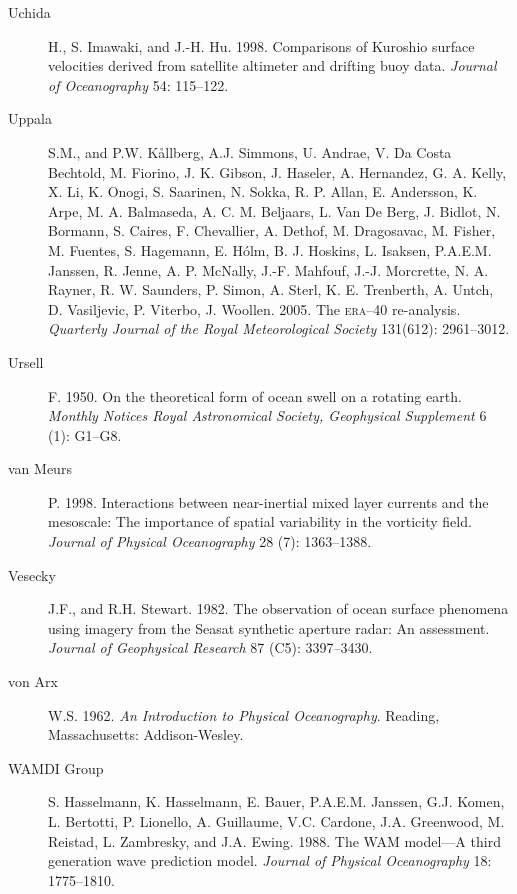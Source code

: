 \begin{description}
\item [Uchida]H., S. Imawaki, and J.-H. Hu. 1998. Comparisons of
  Kuroshio surface velocities derived from satellite altimeter and
  drifting buoy data. \textit{Journal of Oceanography} 54: 115--122.

\item [Uppala]S.M., and P.W. K\r{a}llberg, A.J. Simmons, U. Andrae,
  V. Da Costa Bechtold, M. Fiorino, J. K. Gibson, J. Haseler,
  A. Hernandez, G. A. Kelly, X. Li, K. Onogi, S. Saarinen, N. Sokka,
  R. P. Allan, E. Andersson, K. Arpe, M. A. Balmaseda,
  A. C. M. Beljaars, L. Van De Berg, J. Bidlot, N. Bormann, S. Caires,
  F. Chevallier, A. Dethof, M. Dragosavac, M. Fisher, M. Fuentes,
  S. Hagemann, E. H\'{o}lm, B. J. Hoskins, L. Isaksen,
  P.A.E.M. Janssen, R. Jenne, A. P. McNally, J.-F. Mahfouf,
  J.-J. Morcrette, N. A. Rayner, R. W. Saunders, P. Simon, A. Sterl,
  K. E. Trenberth, A. Untch, D. Vasiljevic, P. Viterbo,
  J. Woollen. 2005. The \textsc{era}--40
  re-analysis. \textit{Quarterly Journal of the Royal Meteorological
    Society} 131(612): 2961--3012.

\item [Ursell]F. 1950. On the theoretical form of ocean swell on a
  rotating earth. \textit{Monthly Notices Royal Astronomical Society,
    Geophysical Supplement} 6 (1): G1--G8.

\item [van Meurs]P. 1998. Interactions between near-inertial mixed
  layer currents and the meso\-scale: The importance of spatial
  variability in the vorticity field. \textit{Journal of Physical
    Oceanography} 28 (7): 1363--1388.

\item [Vesecky]J.F., and R.H. Stewart. 1982. The observation of ocean
  surface phenomena using imagery from the Seasat synthetic aperture
  radar: An assessment.  \textit{Journal of Geophysical Research} 87
  (C5): 3397--3430.

\item [von Arx]W.S. 1962. \textit{An Introduction to Physical
  Oceanography}. Reading, Massachusetts: Addison-Wesley.

\item [WAMDI Group]S. Hasselmann, K. Hasselmann, E. Bauer,
  P.A.E.M. Jans\-sen, G.J. Komen, L. Bertotti, P. Lionello,
  A. Guillaume, V.C. Cardone, J.A. Greenwood, M. Reistad,
  L. Zambresky, and J.A. Ewing. 1988. The WAM model---A third
  generation wave prediction model. \textit{Journal of Physical
    Oceanography} 18: 1775--1810.


\end{description}
